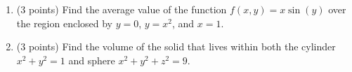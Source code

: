 \documentclass[11pt]{article}
\newenvironment{solution}
  {\textit{Solution.}}
\newcommand{\sol}[1]{
    \begin{customframedproof}[linecolor=orangehdx!75,]
        \begin{solution}
        #1
        \end{solution}
    \end{customframedproof}
}
\begin{document}
\begin{enumerate}
  \sol{

  }
  \item (3 points) Find the average value of the function \(f(x,y) = x\sin(y)\) over the region enclosed by \(y = 0\), \(y = x^{2}\), and \(x = 1\). \\

  \sol{

  }
  \item (3 points) Find the volume of the solid that lives within both the cylinder \(x^{2} + y^{2} = 1\) and sphere \(x^{2} + y^{2} + z^{2} = 9\). \\
  
\end{enumerate}
\end{document}
